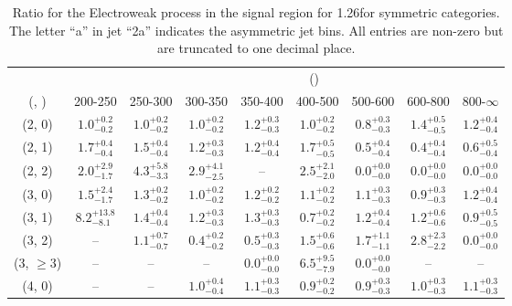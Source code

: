 \begin{table}[h!]
\tiny
\centering
\caption{Ratio for the Electroweak process in the signal region for 1.26\ifb for symmetric categories. The letter ``a'' in jet \eg ``2a''  indicates the asymmetric jet bins. All entries are non-zero but are truncated to one decimal place.\label{tab:ratiosep_ewk_sig_sym}}
\begin{tabular}
{ccccccccc}
	\hline\hline
&	& \multicolumn{8}{c}{\scalht (\gev)} \\ 
	 (\njet,  \nb) & 200-250 & 250-300 & 300-350 & 350-400 & 400-500 & 500-600 & 600-800 & 800-$\infty$ \\ [0.8ex] 
\hline
	(2, 0) & $1.0^{+ 0.2 }_{- 0.2 }$ & $1.0^{+ 0.2 }_{- 0.2 }$ & $1.0^{+ 0.2 }_{- 0.2 }$ & $1.2^{+ 0.3 }_{- 0.3 }$ & $1.0^{+ 0.2 }_{- 0.2 }$ & $0.8^{+ 0.3 }_{- 0.3 }$ & $1.4^{+ 0.5 }_{- 0.5 }$ & $1.2^{+ 0.4 }_{- 0.4 }$ \\[0.5ex] 
	(2, 1) & $1.7^{+ 0.4 }_{- 0.4 }$ & $1.5^{+ 0.4 }_{- 0.4 }$ & $1.2^{+ 0.3 }_{- 0.3 }$ & $1.2^{+ 0.4 }_{- 0.4 }$ & $1.7^{+ 0.5 }_{- 0.5 }$ & $0.5^{+ 0.4 }_{- 0.4 }$ & $0.4^{+ 0.4 }_{- 0.4 }$ & $0.6^{+ 0.5 }_{- 0.4 }$ \\[0.5ex] 
	(2, 2) & $2.0^{+ 2.9 }_{- 1.7 }$ & $4.3^{+ 5.8 }_{- 3.3 }$ & $2.9^{+ 4.1 }_{- 2.5 }$ & -- & $2.5^{+ 2.1 }_{- 2.0 }$ & $0.0^{+ 0.0 }_{- 0.0 }$ & $0.0^{+ 0.0 }_{- 0.0 }$ & $0.0^{+ 0.0 }_{- 0.0 }$ \\[0.5ex] 
	(3, 0) & $1.5^{+ 2.4 }_{- 1.7 }$ & $1.3^{+ 0.2 }_{- 0.2 }$ & $1.0^{+ 0.2 }_{- 0.2 }$ & $1.2^{+ 0.2 }_{- 0.2 }$ & $1.1^{+ 0.2 }_{- 0.2 }$ & $1.1^{+ 0.3 }_{- 0.3 }$ & $0.9^{+ 0.3 }_{- 0.3 }$ & $1.2^{+ 0.4 }_{- 0.4 }$ \\[0.5ex] 
	(3, 1) & $8.2^{+ 13.8 }_{- 8.1 }$ & $1.4^{+ 0.4 }_{- 0.4 }$ & $1.2^{+ 0.3 }_{- 0.3 }$ & $1.3^{+ 0.3 }_{- 0.3 }$ & $0.7^{+ 0.2 }_{- 0.2 }$ & $1.2^{+ 0.4 }_{- 0.4 }$ & $1.2^{+ 0.6 }_{- 0.6 }$ & $0.9^{+ 0.5 }_{- 0.5 }$ \\[0.5ex] 
	(3, 2) & -- & $1.1^{+ 0.7 }_{- 0.7 }$ & $0.4^{+ 0.2 }_{- 0.2 }$ & $0.5^{+ 0.3 }_{- 0.3 }$ & $1.5^{+ 0.6 }_{- 0.6 }$ & $1.7^{+ 1.1 }_{- 1.1 }$ & $2.8^{+ 2.3 }_{- 2.2 }$ & $0.0^{+ 0.0 }_{- 0.0 }$ \\[0.5ex] 
	(3, $\ge3$) & -- & -- & -- & $0.0^{+ 0.0 }_{- 0.0 }$ & $6.5^{+ 9.5 }_{- 7.9 }$ & $0.0^{+ 0.0 }_{- 0.0 }$ & -- & -- \\[0.5ex] 
	(4, 0) & -- & -- & $1.0^{+ 0.4 }_{- 0.4 }$ & $1.1^{+ 0.3 }_{- 0.3 }$ & $0.9^{+ 0.2 }_{- 0.2 }$ & $0.9^{+ 0.3 }_{- 0.3 }$ & $1.0^{+ 0.3 }_{- 0.3 }$ & $1.1^{+ 0.3 }_{- 0.3 }$ \\[0.5ex] 

\end{tabular}
\end{table}
